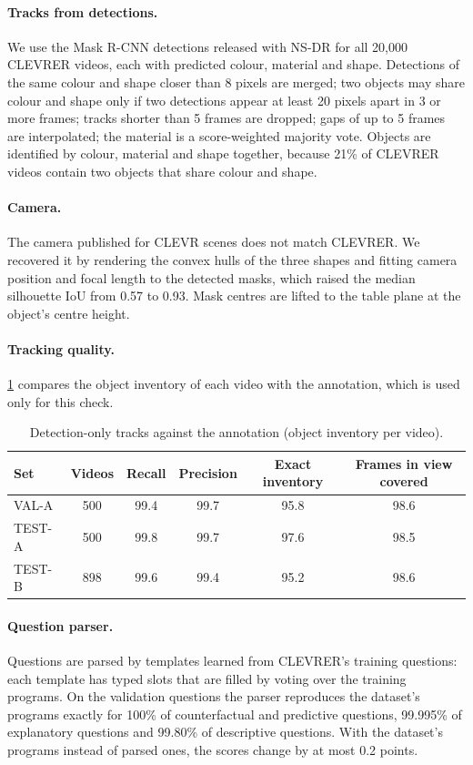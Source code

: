 \paragraph{Tracks from detections.}
We use the Mask R-CNN detections released with NS-DR for all 20,000 CLEVRER videos, each with predicted colour, material and shape.
Detections of the same colour and shape closer than 8 pixels are merged; two objects may share colour and shape only if two detections appear at least 20 pixels apart in 3 or more frames; tracks shorter than 5 frames are dropped; gaps of up to 5 frames are interpolated; the material is a score-weighted majority vote.
Objects are identified by colour, material and shape together, because 21\% of CLEVRER videos contain two objects that share colour and shape.

\paragraph{Camera.}
The camera published for CLEVR scenes does not match CLEVRER.
We recovered it by rendering the convex hulls of the three shapes and fitting camera position and focal length to the detected masks, which raised the median silhouette IoU from 0.57 to 0.93.
Mask centres are lifted to the table plane at the object's centre height.

\paragraph{Tracking quality.}
\cref{tab:percep} compares the object inventory of each video with the annotation, which is used only for this check.

\begin{table}[h]
\caption{Detection-only tracks against the annotation (object inventory per video).}
\label{tab:percep}
\centering
\small
\begin{tabular}{@{}lccccc@{}}
\toprule
Set & Videos & Recall & Precision & Exact inventory & Frames in view covered \\
\midrule
VAL-A & 500 & 99.4 & 99.7 & 95.8 & 98.6 \\
TEST-A & 500 & 99.8 & 99.7 & 97.6 & 98.5 \\
TEST-B & 898 & 99.6 & 99.4 & 95.2 & 98.6 \\
\bottomrule
\end{tabular}
\end{table}

\paragraph{Question parser.}
Questions are parsed by templates learned from CLEVRER's training questions: each template has typed slots that are filled by voting over the training programs.
On the validation questions the parser reproduces the dataset's programs exactly for 100\% of counterfactual and predictive questions, 99.995\% of explanatory questions and 99.80\% of descriptive questions.
With the dataset's programs instead of parsed ones, the scores change by at most 0.2 points.

